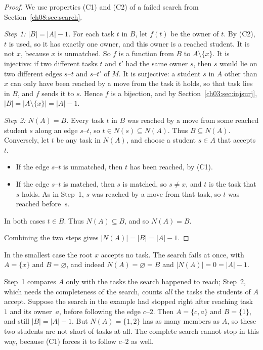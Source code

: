 \begin{proof}
We use properties (C1) and (C2) of a failed search from Section~\ref{ch08:sec:search}.

\emph{Step 1: $|B|=|A|-1$.} For each task $t$ in $B$, let $f(t)$ be the owner of $t$. By (C2), $t$ is used, so it has exactly one owner, and this owner is a reached student. It is not $x$, because $x$ is unmatched. So $f$ is a function from $B$ to $A\setminus\{x\}$. It is injective: if two different tasks $t$ and $t'$ had the same owner $s$, then $s$ would lie on two different edges $s$--$t$ and $s$--$t'$ of $M$. It is surjective: a student $s$ in $A$ other than $x$ can only have been reached by a move from the task it holds, so that task lies in $B$, and $f$ sends it to $s$. Hence $f$ is a bijection, and by Section~\ref{ch03:sec:injsurj}, $|B|=|A\setminus\{x\}|=|A|-1$.

\emph{Step 2: $N(A)=B$.} Every task $t$ in $B$ was reached by a move from some reached student $s$ along an edge $s$--$t$, so $t\in N(s)\subseteq N(A)$. Thus $B\subseteq N(A)$. Conversely, let $t$ be any task in $N(A)$, and choose a student $s\in A$ that accepts $t$.
\begin{itemize}
\item If the edge $s$--$t$ is unmatched, then $t$ has been reached, by (C1).
\item If the edge $s$--$t$ is matched, then $s$ is matched, so $s\ne x$, and $t$ is the task that $s$ holds. As in Step~1, $s$ was reached by a move from that task, so $t$ was reached before~$s$.
\end{itemize}
In both cases $t\in B$. Thus $N(A)\subseteq B$, and so $N(A)=B$.

Combining the two steps gives $|N(A)|=|B|=|A|-1$.
\end{proof}

In the smallest case the root $x$ accepts no task. The search fails at once, with $A=\{x\}$ and $B=\varnothing$, and indeed $N(A)=\varnothing=B$ and $|N(A)|=0=|A|-1$.

Step~1 compares $A$ only with the tasks the search happened to reach; Step~2, which needs the completeness of the search, counts \emph{all} the tasks the students of $A$ accept. Suppose the search in the example had stopped right after reaching task~$1$ and its owner~$a$, before following the edge $c$--$2$. Then $A=\{c,a\}$ and $B=\{1\}$, and still $|B|=|A|-1$. But $N(A)=\{1,2\}$ has as many members as $A$, so these two students are not short of tasks at all. The complete search cannot stop in this way, because (C1) forces it to follow $c$--$2$ as well.

